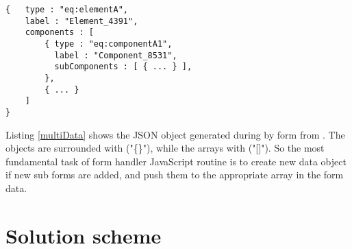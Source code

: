 \begin{lstlisting}[basicstyle=\footnotesize, frame=single, caption={Multi level form data in JSON}, label=multiData, captionpos=b, belowskip=1em, aboveskip=2em]
{	type : "eq:elementA",
	label : "Element_4391",
	components : [
		{ type : "eq:componentA1",
		  label : "Component_8531",	
		  subComponents : [ { ... } ],
		},
		{ ... }
	]
}
\end{lstlisting}

Listing \ref{multiData} shows the JSON object generated during by form from . The objects are surrounded with ("\{\}"), while the arrays with ("[]"). So the most fundamental task of form handler JavaScript routine is to create new data object if new sub forms are added, and push them to the appropriate array in the form data. 




\section{Solution scheme}

